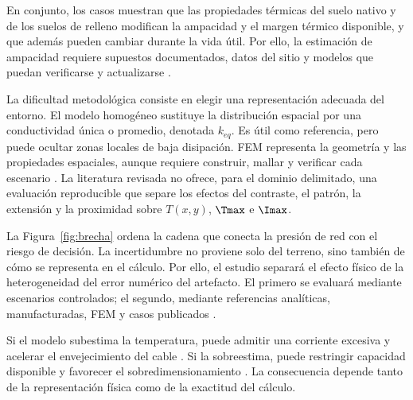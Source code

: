 En conjunto, los casos muestran que las propiedades térmicas del suelo nativo y de los suelos de relleno modifican la ampacidad y el margen térmico disponible, y que además pueden cambiar durante la vida útil. Por ello, la estimación de ampacidad requiere supuestos documentados, datos del sitio y modelos que puedan verificarse y actualizarse \parencites{fariz2026}{mobius2025}.

La dificultad metodológica consiste en elegir una representación adecuada del entorno. El modelo homogéneo sustituye la distribución espacial por una conductividad única o promedio, denotada $k_{eq}$. Es útil como referencia, pero puede ocultar zonas locales de baja disipación. FEM representa la geometría y las propiedades espaciales, aunque requiere construir, mallar y verificar cada escenario \parencites[3--4,93--99]{cigre2025}[1--3]{aldulaimi2024}. La literatura revisada no ofrece, para el dominio delimitado, una evaluación reproducible que separe los efectos del contraste, el patrón, la extensión y la proximidad sobre $T(x,y)$, $\Tmax$ e $\Imax$.

La Figura~\ref{fig:brecha} ordena la cadena que conecta la presión de red con el riesgo de decisión. La incertidumbre no proviene solo del terreno, sino también de cómo se representa en el cálculo. Por ello, el estudio separará el efecto físico de la heterogeneidad del error numérico del artefacto. El primero se evaluará mediante escenarios controlados; el segundo, mediante referencias analíticas, manufacturadas, FEM y casos publicados \parencites[4--6]{enescu2021}[3--4,93--99]{cigre2025}.

Si el modelo subestima la temperatura, puede admitir una corriente excesiva y acelerar el envejecimiento del cable \parencite[1--2,9]{khumalo2025}. Si la sobreestima, puede restringir capacidad disponible y favorecer el sobredimensionamiento \parencites[4--6]{enescu2021}[1--2,9]{khumalo2025}. La consecuencia depende tanto de la representación física como de la exactitud del cálculo.

\vspace{0.15cm}

